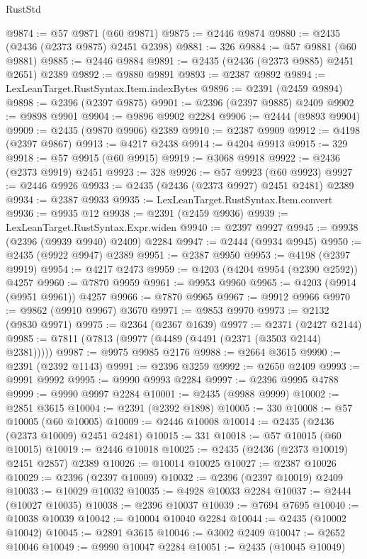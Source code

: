 \begin{lexlean}{RustStd}
\begin{coremodule}
@9874 := @57 @9871 (@60 @9871)
@9875 := @2446 @9874
@9880 := @2435 (@2436 (@2373 @9875) @2451 @2398)
@9881 := 326
@9884 := @57 @9881 (@60 @9881)
@9885 := @2446 @9884
@9891 := @2435 (@2436 (@2373 @9885) @2451 @2651) @2389
@9892 := @9880 @9891
@9893 := @2387 @9892
@9894 := LexLeanTarget.RustSyntax.Item.indexBytes
@9896 := @2391 (@2459 @9894)
@9898 := @2396 (@2397 @9875)
@9901 := @2396 (@2397 @9885) @2409
@9902 := @9898 @9901
@9904 := @9896 @9902 @2284
@9906 := @2444 (@9893 @9904)
@9909 := @2435 (@9870 @9906) @2389
@9910 := @2387 @9909
@9912 := @4198 (@2397 @9867)
@9913 := @4217 @2438
@9914 := @4204 @9913
@9915 := 329
@9918 := @57 @9915 (@60 @9915)
@9919 := @3068 @9918
@9922 := @2436 (@2373 @9919) @2451
@9923 := 328
@9926 := @57 @9923 (@60 @9923)
@9927 := @2446 @9926
@9933 := @2435 (@2436 (@2373 @9927) @2451 @2481) @2389
@9934 := @2387 @9933
@9935 := LexLeanTarget.RustSyntax.Item.convert
@9936 := @9935 @12
@9938 := @2391 (@2459 @9936)
@9939 := LexLeanTarget.RustSyntax.Expr.widen
@9940 := @2397 @9927
@9945 := @9938 (@2396 (@9939 @9940) @2409) @2284
@9947 := @2444 (@9934 @9945)
@9950 := @2435 (@9922 @9947) @2389
@9951 := @2387 @9950
@9953 := @4198 (@2397 @9919)
@9954 := @4217 @2473
@9959 := @4203 (@4204 @9954 (@2390 @2592)) @4257
@9960 := @7870 @9959
@9961 := @9953 @9960
@9965 := @4203 (@9914 (@9951 @9961)) @4257
@9966 := @7870 @9965
@9967 := @9912 @9966
@9970 := @9862 (@9910 @9967) @3670
@9971 := @9853 @9970
@9973 := @2132 (@9830 @9971)
@9975 := @2364 (@2367 @1639)
@9977 := @2371 (@2427 @2144)
@9985 := @7811 (@7813 (@9977 (@4489 (@4491 (@2371 (@3503 @2144) @2381)))))
@9987 := @9975 @9985 @2176
@9988 := @2664 @3615
@9990 := @2391 (@2392 @1143)
@9991 := @2396 @3259
@9992 := @2650 @2409
@9993 := @9991 @9992
@9995 := @9990 @9993 @2284
@9997 := @2396 @9995 @4788
@9999 := @9990 @9997 @2284
@10001 := @2435 (@9988 @9999)
@10002 := @2851 @3615
@10004 := @2391 (@2392 @1898)
@10005 := 330
@10008 := @57 @10005 (@60 @10005)
@10009 := @2446 @10008
@10014 := @2435 (@2436 (@2373 @10009) @2451 @2481)
@10015 := 331
@10018 := @57 @10015 (@60 @10015)
@10019 := @2446 @10018
@10025 := @2435 (@2436 (@2373 @10019) @2451 @2857) @2389
@10026 := @10014 @10025
@10027 := @2387 @10026
@10029 := @2396 (@2397 @10009)
@10032 := @2396 (@2397 @10019) @2409
@10033 := @10029 @10032
@10035 := @4928 @10033 @2284
@10037 := @2444 (@10027 @10035)
@10038 := @2396 @10037
@10039 := @7694 @7695
@10040 := @10038 @10039
@10042 := @10004 @10040 @2284
@10044 := @2435 (@10002 @10042)
@10045 := @2891 @3615
@10046 := @3002 @2409
@10047 := @2652 @10046
@10049 := @9990 @10047 @2284
@10051 := @2435 (@10045 @10049)

\end{coremodule}
\end{lexlean}
